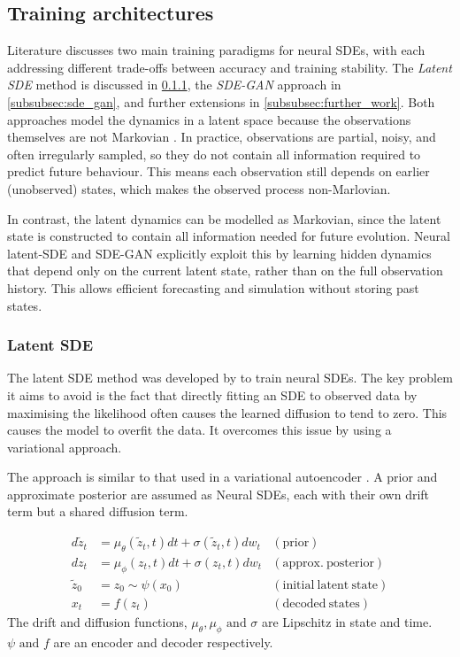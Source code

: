 \subsection{Training architectures}
\label{subsec:training_architectures}
Literature discusses two main training paradigms for neural SDEs, with each addressing different trade-offs between accuracy and training stability. The \emph{Latent SDE} method is discussed in \cref{subsubsec:latentsde}, the \emph{SDE-GAN} approach in \cref{subsubsec:sde_gan}, and further extensions in \cref{subsubsec:further_work}. Both approaches model the dynamics in a latent space because the observations themselves are not Markovian \parencite{kidgerNeuralSDEsInfiniteDimensional2021}. In practice,
observations are partial, noisy, and often irregularly sampled, so they do not contain all information required to
predict future behaviour. This means each observation still depends on earlier (unobserved) states, which makes the
observed process non-Marlovian. 

In contrast, the latent dynamics can be modelled as Markovian, since the latent state is constructed to contain all
information needed for future evolution. Neural latent-SDE and SDE-GAN explicitly exploit this by learning
hidden dynamics that depend only on the current latent state, rather than on the full observation history. This allows
efficient forecasting and simulation without storing past states.

\subsubsection{Latent SDE}
\label{subsubsec:latentsde}
The latent SDE method was developed by \textcite{liScalableGradientsStochastic2020} to train neural SDEs. The key
problem it aims to avoid is the fact that directly fitting an SDE to observed data by maximising the likelihood often
causes the learned diffusion to tend to zero. This causes the model to overfit the data. It overcomes this issue by
using a variational approach. 

The approach is similar to that used in a variational autoencoder \parencite{kingmaAutoEncodingVariationalBayes2014}. A
prior and approximate posterior are assumed as Neural SDEs, each with their own drift term but a shared diffusion term.

\begin{equation}
    \begin{aligned}
        d\tilde{z}_{t}&=\mu_{\theta} (\tilde{z}_{t},t)dt+\sigma (\tilde{z}_{t},t)dw_{t}& ({{\mathrm {prior}}})\\ 
        dz_{t}&=\mu _{\phi} (z_{t},t)dt+\sigma (z_{t},t)dw_{t} &({{\mathrm {approx. ~posterior}}})\\
        \tilde{z}_{0}&=z_{0}\sim \psi (x_{0})& ({{\mathrm {initial~ latent ~state}}})\\ 
        x_{t}& = f(z_{t})& ({{\mathrm {decoded ~states}}})
    \end{aligned}
\end{equation}
The drift and diffusion functions, \(\mu_{\theta}, \mu _{\phi} \text{ and } \sigma \) are Lipschitz in state and time.
\( \psi \text{ and } f\) are an encoder and decoder respectively. 

